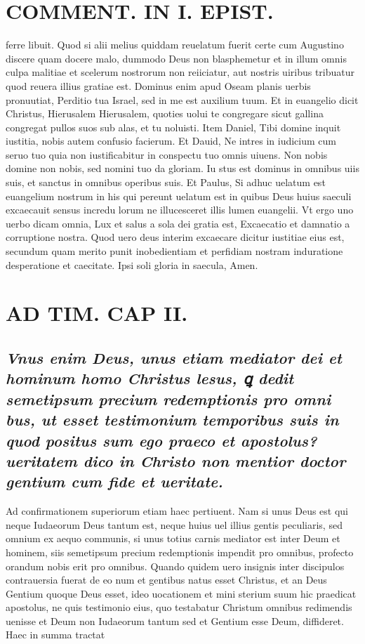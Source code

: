 \documentclass{article}
\begin{document}
\begin{pages}
\section*{COMMENT. IN I. EPIST. }\pstart ferre libuit. Quod si alii melius quiddam reuelatum fuerit certe cum Augustino discere quam docere malo, dummodo Deus non blasphemetur et in illum omnis culpa malitiae et scelerum nostrorum non reiiciatur, aut nostris uiribus tribuatur quod reuera illius gratiae est. Dominus enim apud Oseam planis uerbis pronuutiat, Perditio tua Israel, sed in me est auxilium tuum. Et in euangelio dicit Christus, Hierusalem Hierusalem, quoties uolui te congregare sicut gallina congregat pullos suos sub alas, et tu noluisti. Item Daniel, Tibi domine inquit iustitia, nobis autem confusio facierum. Et Dauid, Ne intres in iudicium cum seruo tuo quia non iustificabitur in conspectu tuo omnis uiuens. Non nobis domine non nobis, sed nomini tuo da gloriam. Iu stus est dominus in omnibus uiis suis, et sanctus in omnibus operibus suis. Et Paulus, Si adhuc uelatum est euangelium nostrum in his qui pereunt uelatum est in quibus Deus huius saeculi excaecauit sensus incredu lorum ne illucesceret illis lumen euangelii. Vt ergo uno uerbo dicam omnia, Lux et salus a sola dei gratia est, Excaecatio et damnatio a corruptione nostra. Quod uero deus interim excaecare dicitur iustitiae eius est, secundum quam merito punit inobedientiam et perfidiam nostram induratione desperatione et caecitate. Ipsi soli gloria in saecula, Amen.  \pend
\section*{AD TIM. CAP II. }
\marginpar{[ p.116 ]} 
{}
\subsection*{\textit{Vnus enim Deus, unus etiam mediator dei et hominum homo Christus lesus, ꝗ dedit semetipsum precium redemptionis pro omni bus, ut esset testimonium temporibus suis in quod positus sum ego praeco et apostolus? ueritatem dico in Christo non mentior doctor gentium cum fide et ueritate. }}\pstart Ad confirmationem superiorum etiam haec pertiuent. Nam si unus Deus est qui neque Iudaeorum Deus tantum est, neque huius uel illius gentis peculiaris, sed omnium ex aequo communis, si unus totius carnis mediator est inter Deum et hominem, siis semetipsum precium redemptionis impendit pro omnibus, profecto orandum nobis erit pro omnibus. Quando quidem uero insignis inter discipulos contrauersia fuerat de eo num et gentibus natus esset Christus, et an Deus Gentium quoque Deus esset, ideo uocationem et mini sterium suum hic praedicat apostolus, ne quis testimonio eius, quo testabatur Christum omnibus redimendis uenisse et Deum non Iudaeorum tantum sed et Gentium esse Deum, diffideret. Haec in summa tractat  \pend

\end{pages}
\end{document}
